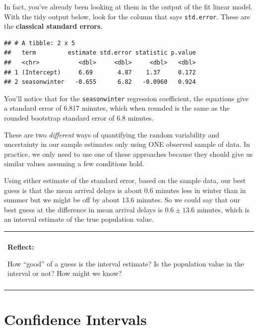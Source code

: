 \documentclass[
]{book}
\newenvironment{Shaded}{\begin{snugshade}}{\end{snugshade}}
\newcommand{\CommentTok}[1]{\textcolor[rgb]{0.56,0.35,0.01}{\textit{#1}}}
\newcommand{\KeywordTok}[1]{\textcolor[rgb]{0.13,0.29,0.53}{\textbf{#1}}}
\newcommand{\NormalTok}[1]{#1}
\newcommand{\OperatorTok}[1]{\textcolor[rgb]{0.81,0.36,0.00}{\textbf{#1}}}
\newcommand{\StringTok}[1]{\textcolor[rgb]{0.31,0.60,0.02}{#1}}
\newenvironment{reflect}
{
    \begin{center}
    
    \begin{tabular}{|p{0.8\textwidth}|}
    \rowcolor{LightBlue}
    \hline\\
    \rowcolor{LightBlue}
    \textbf{Reflect:}
}
{
    \\\rowcolor{LightBlue}
    \\\hline
    \end{tabular} 
    \end{center}
}
\begin{document}
In fact, you've already been looking at them in the output of the fit linear model. With the tidy output below, look for the column that says \texttt{std.error}. These are the \textbf{classical standard errors}.

\begin{Shaded}
\end{Shaded}

\begin{verbatim}
## # A tibble: 2 x 5
##   term         estimate std.error statistic p.value
##   <chr>           <dbl>     <dbl>     <dbl>   <dbl>
## 1 (Intercept)     6.69       4.87    1.37     0.172
## 2 seasonwinter   -0.655      6.82   -0.0960   0.924
\end{verbatim}

You'll notice that for the \texttt{seasonwinter} regression coefficient, the equations give a standard error of 6.817 minutes, which when rounded is the same as the rounded bootstrap standard error of 6.8 minutes.

These are two \emph{different} ways of quantifying the random variability and uncertainty in our sample estimates only using ONE observed sample of data. In practice, we only need to use one of these approaches because they should give us similar values assuming a few conditions hold.

Using either estimate of the standard error, based on the sample data, our best guess is that the mean arrival delays is about 0.6 minutes less in winter than in summer but we might be off by about 13.6 minutes. So we could say that our best guess at the difference in mean arrival delays is \(0.6\pm 13.6\) minutes, which is an interval estimate of the true population value.

\begin{reflect}
How ``good'' of a guess is the interval estimate? Is the population
value in the interval or not? How might we know?
\end{reflect}

\hypertarget{confidence-intervals}{%
\section{Confidence Intervals}\label{confidence-intervals}}
\end{document}
